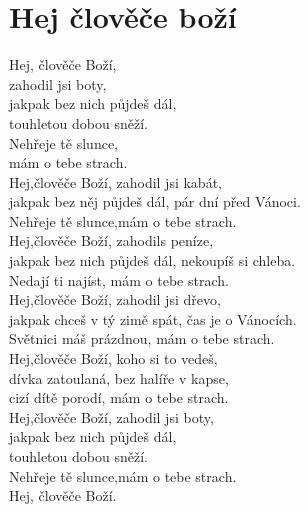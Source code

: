 \section{Hej člověče boží}
\onehalfspacing

Hej, člověče Boží, \\
zahodil jsi boty,\\
jakpak bez nich půjdeš dál,\\

touhletou dobou sněží.\\
Nehřeje tě slunce, \\
mám o tebe strach.\\

Hej,člověče Boží, zahodil jsi kabát,   \\
jakpak bez něj půjdeš dál, pár dní před Vánoci.\\
Nehřeje tě slunce,mám o tebe strach.\\

Hej,člověče Boží, zahodils peníze,\\
jakpak bez nich půjdeš dál, nekoupíš si chleba.\\
Nedají ti najíst, mám o tebe strach.\\

Hej,člověče Boží, zahodil jsi dřevo,\\
jakpak chceš v tý zimě spát, čas je o Vánocích.\\
Světnici máš prázdnou, mám o tebe strach.\\

Hej,člověče Boží, koho si to vedeš,\\
dívka zatoulaná, bez halíře v kapse,   \\
cizí dítě porodí, mám o tebe strach.\\

Hej,člověče Boží, zahodil jsi boty,\\
jakpak bez nich půjdeš dál,\\
touhletou dobou sněží.\\
Nehřeje tě slunce,mám o tebe strach.\\

Hej, člověče Boží.\\